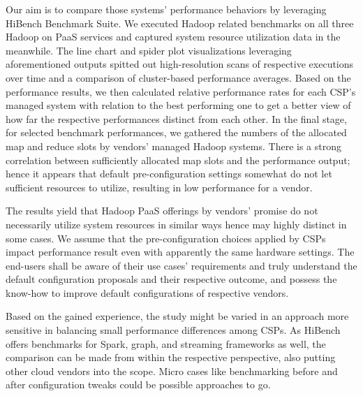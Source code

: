 \documentclass[review]{elsarticle}
\begin{document}
Our aim is to compare those systems' performance behaviors by leveraging HiBench Benchmark Suite. We executed Hadoop related benchmarks on all three Hadoop on PaaS services and captured system resource utilization data in the meanwhile. The line chart and spider plot visualizations leveraging aforementioned outputs spitted out high-resolution scans of respective executions over time and a comparison of cluster-based performance averages. Based on the performance results, we then calculated relative performance rates for each CSP's managed system with relation to the best performing one to get a better view of how far the respective performances distinct from each other. In the final stage, for selected benchmark performances, we gathered the numbers of the allocated map and reduce slots by vendors' managed Hadoop systems. There is a strong correlation between sufficiently allocated map slots and the performance output; hence it appears that default  pre-configuration settings somewhat do not let sufficient resources to utilize, resulting in low performance for a vendor.

The results yield that Hadoop PaaS offerings by vendors' promise do not necessarily utilize system resources in similar ways hence may highly distinct in some cases. We assume that the pre-configuration choices applied by CSPs impact performance result even with apparently the same hardware settings. The end-users shall be aware of their use cases' requirements and truly understand the default configuration proposals and their respective outcome, and possess the know-how to improve default configurations of respective vendors.

Based on the gained experience, the study might be varied in an approach more sensitive in balancing small performance differences among CSPs. As HiBench offers benchmarks for Spark, graph, and streaming frameworks as well, the comparison can be made from within the respective perspective, also putting other cloud vendors into the scope. Micro cases like benchmarking before and after configuration tweaks could be possible approaches to go.


\end{document}
